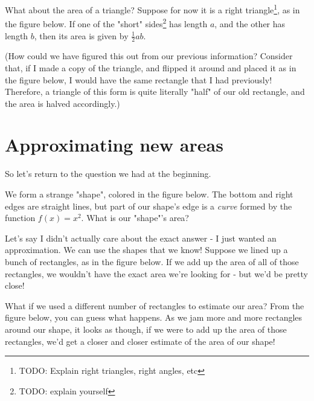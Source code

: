 \documentclass{book}
\begin{document}


What about the area of a triangle? Suppose for now it is a right triangle\footnote{TODO: Explain right triangles, right angles, etc}, as in the figure below. If one of the "short" sides\footnote{TODO: explain yourself} has length $a$, and the other has length $b$, then its area is given by $\frac{1}{2}ab$. 


(How could we have figured this out from our previous information? Consider that, if I made a copy of the triangle, and flipped it around and placed it as in the figure below,  I would have the same rectangle that I had previously! Therefore, a triangle of this form is quite literally "half" of our old rectangle, and the area is halved accordingly.)



\section{Approximating new areas}

So let's return to the question we had at the beginning.

We form a strange "shape", colored in the figure below. The bottom and right edges are straight lines, but part of our shape's edge is a \textit{curve} formed by the function $f(x) = x^2$. What is our "shape"'s area?



Let's say I didn't actually care about the exact answer - I just wanted an approximation. We can use the shapes that we know! Suppose we lined up a bunch of rectangles, as in the figure below. If we add up the area of all of those rectangles, we wouldn't have the exact area we're looking for - but we'd be pretty close!



What if we used a different number of rectangles to estimate our area? From the figure below, you can guess what happens. As we jam more and more rectangles around our shape, it looks as though, if we were to add up the area of those rectangles, we'd get a closer and closer estimate of the area of our shape!
\end{document}

